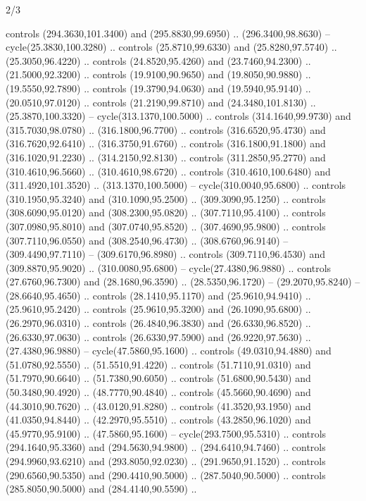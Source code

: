 \begin{flagdescription}{2/3}
\begin{scope}[xshift=0.5\flaglength,yshift=0.5\flagwidth,scale=\stretchfactor]
\begin{scope}[scale=0.001645\flagwidth,yshift=65mm,xshift=-63mm]
\begin{scope}[y=0.80pt, x=0.80pt, yscale=-1,]
\begin{scope}[cm={{1.33333,0.0,0.0,1.33333,(0.0,1e-05)}}]
  controls (294.3630,101.3400) and (295.8830,99.6950) .. (296.3400,98.8630) --
  cycle(25.3830,100.3280) .. controls (25.8710,99.6330) and (25.8280,97.5740) ..
  (25.3050,96.4220) .. controls (24.8520,95.4260) and (23.7460,94.2300) ..
  (21.5000,92.3200) .. controls (19.9100,90.9650) and (19.8050,90.9880) ..
  (19.5550,92.7890) .. controls (19.3790,94.0630) and (19.5940,95.9140) ..
  (20.0510,97.0120) .. controls (21.2190,99.8710) and (24.3480,101.8130) ..
  (25.3870,100.3320) -- cycle(313.1370,100.5000) .. controls (314.1640,99.9730)
  and (315.7030,98.0780) .. (316.1800,96.7700) .. controls (316.6520,95.4730)
  and (316.7620,92.6410) .. (316.3750,91.6760) .. controls (316.1800,91.1800)
  and (316.1020,91.2230) .. (314.2150,92.8130) .. controls (311.2850,95.2770)
  and (310.4610,96.5660) .. (310.4610,98.6720) .. controls (310.4610,100.6480)
  and (311.4920,101.3520) .. (313.1370,100.5000) -- cycle(310.0040,95.6800) ..
  controls (310.1950,95.3240) and (310.1090,95.2500) .. (309.3090,95.1250) ..
  controls (308.6090,95.0120) and (308.2300,95.0820) .. (307.7110,95.4100) ..
  controls (307.0980,95.8010) and (307.0740,95.8520) .. (307.4690,95.9800) ..
  controls (307.7110,96.0550) and (308.2540,96.4730) .. (308.6760,96.9140) --
  (309.4490,97.7110) -- (309.6170,96.8980) .. controls (309.7110,96.4530) and
  (309.8870,95.9020) .. (310.0080,95.6800) -- cycle(27.4380,96.9880) .. controls
  (27.6760,96.7300) and (28.1680,96.3590) .. (28.5350,96.1720) --
  (29.2070,95.8240) -- (28.6640,95.4650) .. controls (28.1410,95.1170) and
  (25.9610,94.9410) .. (25.9610,95.2420) .. controls (25.9610,95.3200) and
  (26.1090,95.6800) .. (26.2970,96.0310) .. controls (26.4840,96.3830) and
  (26.6330,96.8520) .. (26.6330,97.0630) .. controls (26.6330,97.5900) and
  (26.9220,97.5630) .. (27.4380,96.9880) -- cycle(47.5860,95.1600) .. controls
  (49.0310,94.4880) and (51.0780,92.5550) .. (51.5510,91.4220) .. controls
  (51.7110,91.0310) and (51.7970,90.6640) .. (51.7380,90.6050) .. controls
  (51.6800,90.5430) and (50.3480,90.4920) .. (48.7770,90.4840) .. controls
  (45.5660,90.4690) and (44.3010,90.7620) .. (43.0120,91.8280) .. controls
  (41.3520,93.1950) and (41.0350,94.8440) .. (42.2970,95.5510) .. controls
  (43.2850,96.1020) and (45.9770,95.9100) .. (47.5860,95.1600) --
  cycle(293.7500,95.5310) .. controls (294.1640,95.3360) and (294.5630,94.9800)
  .. (294.6410,94.7460) .. controls (294.9960,93.6210) and (293.8050,92.0230) ..
  (291.9650,91.1520) .. controls (290.6560,90.5350) and (290.4410,90.5000) ..
  (287.5040,90.5000) .. controls (285.8050,90.5000) and (284.4140,90.5590) ..

\end{scope}
\end{scope}
\end{scope}
\end{scope}
\end{flagdescription}
